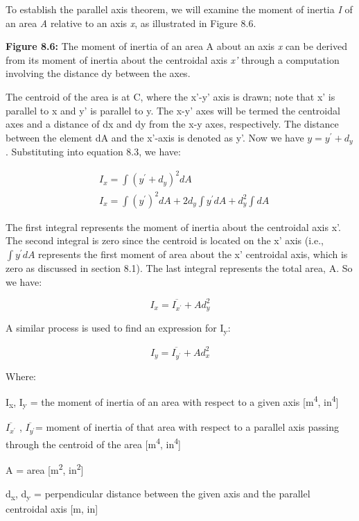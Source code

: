 \documentclass[
  letterpaper,
  DIV=11,
  numbers=noendperiod]{scrreprt}
\begin{document}
To establish the parallel axis theorem, we will examine the moment of
inertia \emph{I} of an area \emph{A} relative to an axis \emph{x}, as
illustrated in Figure 8.6.

\textbf{Figure 8.6:} The moment of inertia of an area A about an axis
\emph{x} can be derived from its moment of inertia about the centroidal
axis \emph{x'} through a computation involving the distance dy between
the axes.

The centroid of the area is at C, where the x'-y' axis is drawn; note
that x' is parallel to x and y' is parallel to y. The x-y' axes will be
termed the centroidal axes and a distance of dx and dy from the x-y
axes, respectively. The distance between the element dA and the x'-axis
is denoted as y'. Now we have \(y=y^{\prime}+d_y\). Substituting into
equation 8.3, we have:

\[
\begin{aligned}
& I_x=\int\left(y^{\prime}+d_y\right)^2 d A \\
& I_x=\int\left(y^{\prime}\right)^2 d A+2 d_y \int y^{\prime} d A+d_y^2 \int d A
\end{aligned}
\]

The first integral represents the moment of inertia about the centroidal
axis x'. The second integral is zero since the centroid is located on
the x' axis (i.e., \(\int y^{\prime} d A\) represents the first moment
of area about the x' centroidal axis, which is zero as discussed in
section 8.1). The last integral represents the total area, A. So we
have:

\[
I_x=\overline{I_{x^{\prime}}}+A d_y^2
\]

A similar process is used to find an expression for I\textsubscript{y}:

\[
I_y=\overline{I_{y^{\prime}}}+A d_x^2
\]

Where:

I\textsubscript{x}, I\textsubscript{y} = the moment of inertia of an
area with respect to a given axis {[}m\textsuperscript{4},
in\textsuperscript{4}{]}

\(\overline{I_{x^{\prime}}}\) , \(\overline{I_{y^{\prime}}}\)= moment of
inertia of that area with respect to a parallel axis passing through the
centroid of the area {[}m\textsuperscript{4}, in\textsuperscript{4}{]}

A = area {[}m\textsuperscript{2}, in\textsuperscript{2}{]}

d\textsubscript{x}, d\textsubscript{y} = perpendicular distance between
the given axis and the parallel centroidal axis {[}m, in{]}
\end{document}
